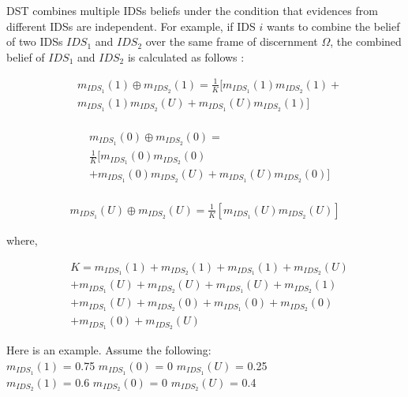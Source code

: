 \documentclass[conference]{IEEEtran}
\begin{document}
DST combines multiple IDSs beliefs under the condition that evidences from different IDSs are independent. For example, if IDS $i$ wants to combine the belief of two IDSs $IDS_{1}$ and $IDS_{2}$ over the same frame of discernment  $\Omega$, the combined belief of $IDS_{1}$ and $IDS_{2}$ is calculated
as follows \cite{yu2002evidential}:

\begin{equation}
\begin{aligned}
&m_{IDS_{1}}(1)\oplus m_{IDS_{2}}(1) = \frac{1}{K}[m_{IDS_{1}}(1)m_{IDS_{2}}(1)+\\
&m_{IDS_{1}}(1)m_{IDS_{2}}(U)+m_{IDS_{1}}(U)m_{IDS_{2}}(1)] \\
\end{aligned}
\end{equation}

\begin{equation}
\begin{aligned}
&m_{IDS_{1}}(0)\oplus m_{IDS_{2}}(0) = \\
&\frac{1}{K}[m_{IDS_{1}}(0)m_{IDS_{2}}(0)\\
&+m_{IDS_{1}}(0)m_{IDS_{2}}(U)+m_{IDS_{1}}(U)m_{IDS_{2}}(0)] \\
\end{aligned}
\end{equation}

\begin{equation}
\begin{aligned}
m_{IDS_{1}}(U)\oplus m_{IDS_{2}}(U) =
\frac{1}{K}[m_{IDS_{1}}(U)m_{IDS_{2}}(U)]
\end{aligned}
\end{equation}

where,

\begin{equation}
\begin{aligned}
&K = m_{IDS_{1}}(1)+m_{IDS_{2}}(1)+m_{IDS_{1}}(1)+m_{IDS_{2}}(U)\\
&+m_{IDS_{1}}(U)+m_{IDS_{2}}(U)+m_{IDS_{1}}(U)+m_{IDS_{2}}(1)\\
&+m_{IDS_{1}}(U)+m_{IDS_{2}}(0)+m_{IDS_{1}}(0)+m_{IDS_{2}}(0)\\
&+m_{IDS_{1}}(0)+m_{IDS_{2}}(U)
\end{aligned}
\end{equation}

Here is an example. Assume the following:\\
$m_{IDS_{1}}(1)$ = 0.75 $m_{IDS_{1}}(0)$ = 0 $m_{IDS_{1}}(U)$ = 0.25\\
$m_{IDS_{2}}(1)$ = 0.6 $m_{IDS_{2}}(0)$ = 0 $m_{IDS_{2}}(U)$ = 0.4\\
\end{document}
